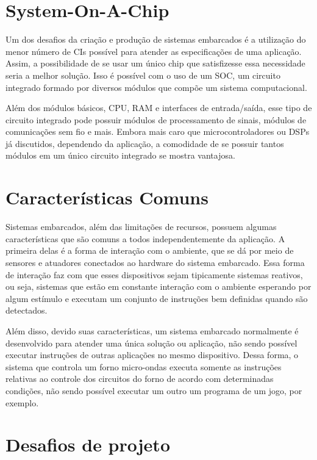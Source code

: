 \section{System-On-A-Chip}

Um dos desafios da criação e produção de sistemas embarcados é a utilização do menor número de \gls{CI}s possível para atender as especificações de uma aplicação. Assim, a possibilidade de se usar um único chip que satisfizesse essa necessidade seria a melhor solução. Isso é possível com o uso de um \gls{SOC}, um circuito integrado formado por diversos módulos que compõe um sistema computacional. \cite{hamacher2011computer}

Além dos módulos básicos, \gls{CPU}, \gls{RAM} e interfaces de entrada/saída, esse tipo de circuito integrado pode possuir módulos de processamento de sinais, módulos de comunicações sem fio e mais. Embora mais caro que microcontroladores ou \gls{DSP}s já discutidos, dependendo da aplicação, a comodidade de se possuir tantos módulos em um único circuito integrado se mostra vantajosa.



\section{Características Comuns}

Sistemas embarcados, além das limitações de recursos, possuem algumas características que são comuns a todos independentemente da aplicação. A primeira delas é a forma de interação com o ambiente, que se dá por meio de sensores e atuadores conectados ao hardware do sistema embarcado. Essa forma de interação faz com que esses dispositivos sejam tipicamente sistemas reativos, ou seja, sistemas que estão em constante interação com o ambiente esperando por algum estímulo e executam um conjunto de instruções bem definidas quando são detectados.

Além disso, devido suas características, um sistema embarcado normalmente é desenvolvido para atender uma única solução ou aplicação, não sendo possível executar instruções de outras aplicações no mesmo dispositivo. Dessa forma, o sistema que controla um forno micro-ondas executa somente as instruções relativas ao controle dos circuitos do forno de acordo com determinadas condições, não sendo possível executar um outro um programa de um jogo, por exemplo. 



\section{Desafios de projeto}

